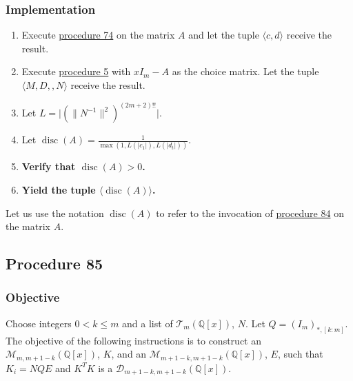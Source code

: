 \documentclass[twocolumn]{article}
\DeclareMathOperator{\disc}{disc}
\begin{document}
			\subsubsection{Implementation}
				\begin{enumerate}
					\item Execute \hyperref[sec:procedure 74]{procedure 74} on the matrix $A$ and let the tuple $\langle c,d\rangle$ receive the result.
					\item Execute \hyperref[sec:procedure 5]{procedure 5} with $xI_m-A$ as the choice matrix. Let the tuple $\langle M,D,,N\rangle$ receive the result.
					\item Let $L=\lvert(\lVert N^{-1}\rVert^2)^{(2m+2)!!}\rvert$.
					\item Let $\disc(A)=\frac{1}{\max(1,L(\lvert c_1\rvert),L(\lvert d_t\rvert))}$.
					\item \textbf{Verify that $\disc(A)>0$.}
					\item \textbf{Yield the tuple $\langle\disc(A)\rangle$.}
				\end{enumerate}
		Let us use the notation $\disc(A)$ to refer to the invocation of \hyperref[sec:procedure 84]{procedure 84} on the matrix $A$.
		\subsection{Procedure 85}\label{sec:procedure 85}
			\subsubsection{Objective}
				Choose integers $0<k\le m$ and a list of $\mathcal{T}_m(\mathbb{Q}[x])$, $N$. Let $Q=(I_m)_{*,[k:m]}$. The objective of the following instructions is to construct an  $\mathcal{M}_{m,m+1-k}(\mathbb{Q}[x])$, $K$, and an $\mathcal{M}_{m+1-k,m+1-k}(\mathbb{Q}[x])$, $E$, such that $K_i=NQE$ and $K^TK$ is a $\mathcal{D}_{m+1-k,m+1-k}(\mathbb{Q}[x])$.
\end{document}
